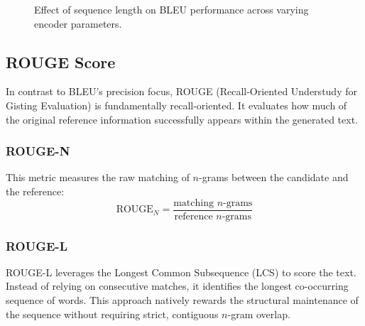 \documentclass[10pt, conference]{IEEEtran}
\begin{document}
\begin{figure}[h]
\centering
{}
\caption{Effect of sequence length on BLEU performance across varying encoder parameters.}
\label{fig:bleu_graph}
\end{figure}

\subsection{\textbf{ROUGE Score}}
In contrast to BLEU's precision focus, ROUGE (Recall-Oriented Understudy for Gisting Evaluation) is fundamentally recall-oriented. It evaluates how much of the original reference information successfully appears within the generated text.

\subsubsection{\textbf{ROUGE-N}}
This metric measures the raw matching of $n$-grams between the candidate and the reference:
\begin{equation}
    \text{ROUGE}_N = \frac{\text{matching } n\text{-grams}}{\text{reference } n\text{-grams}}
\end{equation}

\subsubsection{\textbf{ROUGE-L}}
ROUGE-L leverages the Longest Common Subsequence (LCS) to score the text. Instead of relying on consecutive matches, it identifies the longest co-occurring sequence of words. This approach natively rewards the structural maintenance of the sequence without requiring strict, contiguous $n$-gram overlap.
\end{document}
